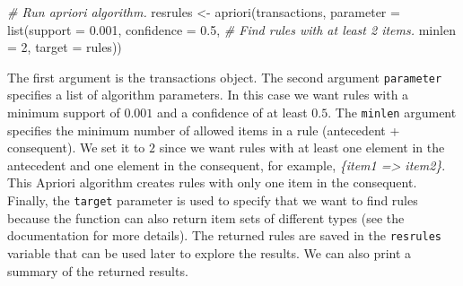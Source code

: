 \documentclass[
  11pt,
]{krantz}
\newenvironment{Shaded}{\begin{snugshade}}{\end{snugshade}}
\newcommand{\AttributeTok}[1]{\textcolor[rgb]{0.61,0.61,0.61}{#1}}
\newcommand{\CommentTok}[1]{\textcolor[rgb]{0.37,0.37,0.37}{\textit{#1}}}
\newcommand{\DecValTok}[1]{\textcolor[rgb]{0.06,0.06,0.06}{#1}}
\newcommand{\FloatTok}[1]{\textcolor[rgb]{0.06,0.06,0.06}{#1}}
\newcommand{\FunctionTok}[1]{\textcolor[rgb]{0,0,0}{#1}}
\newcommand{\NormalTok}[1]{#1}
\newcommand{\OtherTok}[1]{\textcolor[rgb]{0.37,0.37,0.37}{#1}}
\newcommand{\StringTok}[1]{\textcolor[rgb]{0.5,0.5,0.5}{#1}}
\begin{document}
\begin{Shaded}
\begin{Highlighting}[]
\CommentTok{\# Run apriori algorithm.}
\NormalTok{resrules }\OtherTok{\textless{}{-}} \FunctionTok{apriori}\NormalTok{(transactions,}
                    \AttributeTok{parameter =} \FunctionTok{list}\NormalTok{(}\AttributeTok{support =} \FloatTok{0.001}\NormalTok{,}
                                     \AttributeTok{confidence =} \FloatTok{0.5}\NormalTok{,}
                                     \CommentTok{\# Find rules with at least 2 items.}
                                     \AttributeTok{minlen =} \DecValTok{2}\NormalTok{,}
                                     \AttributeTok{target =} \StringTok{\textquotesingle{}rules\textquotesingle{}}\NormalTok{))}
\end{Highlighting}
\end{Shaded}

The first argument is the transactions object. The second argument \texttt{parameter} specifies a list of algorithm parameters. In this case we want rules with a minimum support of \(0.001\) and a confidence of at least \(0.5\). The \texttt{minlen} argument specifies the minimum number of allowed items in a rule (antecedent + consequent). We set it to \(2\) since we want rules with at least one element in the antecedent and one element in the consequent, for example, \emph{\{item1 =\textgreater{} item2\}}. This Apriori algorithm creates rules with only one item in the consequent. Finally, the \texttt{target} parameter is used to specify that we want to find rules because the function can also return item sets of different types (see the documentation for more details). The returned rules are saved in the \texttt{resrules} variable that can be used later to explore the results. We can also print a summary of the returned results.
\end{document}
